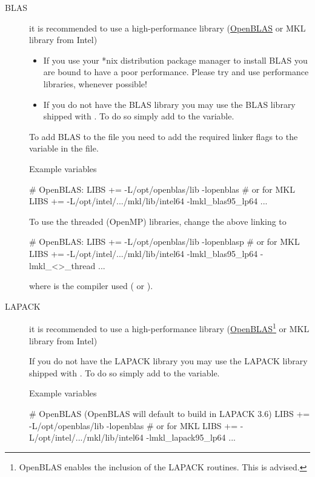 \begin{description}

  \item[BLAS] %
  it is recommended to use a high-performance library
  (\href{https://github.com/xianyi/OpenBLAS}{OpenBLAS} or MKL
  library from Intel)
  
  \begin{itemize}
    \item If you use your *nix distribution package manager to install
    BLAS you are bound to have a poor performance. Please try and use
    performance libraries, whenever possible!

    \item If you do not have the BLAS library you may use the BLAS
    library shipped with \siesta. To do so simply add
     to the  variable.
  \end{itemize}

  To add BLAS to the  file you need to add the
  required linker flags to the  variable in the
   file.

  Example variables
\begin{shellexample}
  # OpenBLAS:
  LIBS += -L/opt/openblas/lib -lopenblas
  # or for MKL
  LIBS += -L/opt/intel/.../mkl/lib/intel64 -lmkl_blas95_lp64 ...
\end{shellexample}

  To use the threaded (OpenMP) libraries, change the above linking
  to
\begin{shellexample}
  # OpenBLAS:
  LIBS += -L/opt/openblas/lib -lopenblasp
  # or for MKL
  LIBS += -L/opt/intel/.../mkl/lib/intel64 -lmkl_blas95_lp64
    -lmkl_<>_thread ...
\end{shellexample}
  where \shell{<>} is the compiler used ( or ).

  \item[LAPACK]%
  it is recommended to use a high-performance library
  (\href{https://github.com/xianyi/OpenBLAS}{OpenBLAS}\footnote{OpenBLAS
      enables the inclusion of the LAPACK routines. This is advised.}
  or MKL library from Intel)

  If you do not have the LAPACK library you may use the LAPACK
  library shipped with \siesta. To do so simply add
   to the  variable.

  Example variables
\begin{shellexample}
  # OpenBLAS (OpenBLAS will default to build in LAPACK 3.6)
  LIBS += -L/opt/openblas/lib -lopenblas
  # or for MKL
  LIBS += -L/opt/intel/.../mkl/lib/intel64 -lmkl_lapack95_lp64 ...
\end{shellexample}


\end{description}
